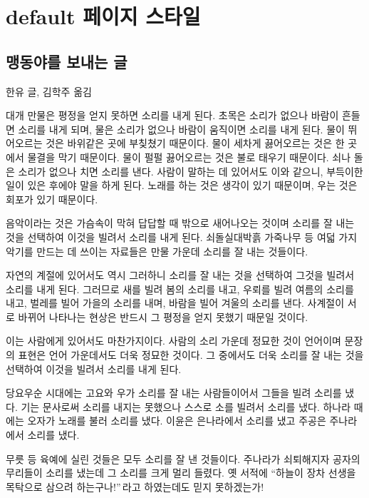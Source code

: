 \documentclass[demo,chapter,openany,amsmath,gremph,lwarp]{oblivoir}
\def\epigraph#1#2{#1\quad #2}
\begin{document}
\chapter{default 페이지 스타일}

\section{맹동야를 보내는 글}
\epigraph{한유 글, }{김학주 옮김}

대개 만물은 평정을 얻지 못하면 소리를 내게 된다.
초목은 소리가 없으나 바람이 흔들면 소리를 내게 되며, 물은 소리가 없으나 바람이
움직이면 소리를 내게 된다. 물이 뛰어오르는 것은 바위같은 곳에 부칮쳤기
때문이다. 물이 세차게 끓어오르는 것은 한 곳에서 물결을 막기 때문이다.
물이 펄펄 끓어오르는 것은 불로 태우기 때문이다. 쇠나 돌은 소리가 없으나
치면 소리를 낸다. 사람이 말하는 데 있어서도 이와 같으니,
부득이한 일이 있은 후에야 말을 하게 된다. 노래를 하는 것은 생각이
있기 때문이며, 우는 것은 회포가 있기 때문이다.

음악이라는 것은 가슴속이 막혀 답답할 때 밖으로 새어나오는 것이며
소리를 잘 내는 것을 선택하여 이것을 빌려서 소리를 내게 된다.
쇠\cntrdot 돌\cntrdot 실\cntrdot 대\cntrdot 박\cntrdot 흙\cntrdot 
가죽\cntrdot 나무 등 여덟 가지 악기를 만드는 데 쓰이는 자료들은 만물
가운데 소리를 잘 내는 것들이다.

자연의 계절에 있어서도 역시 그러하니 소리를 잘 내는 것을 선택하여 그것을
빌려서 소리를 내게 된다. 그러므로 새를 빌려 봄의 소리를 내고, 우뢰를
빌려 여름의 소리를 내고, 벌레를 빌어 가을의 소리를 내며,
바람을 빌어 겨울의 소리를 낸다. 사계절이 서로 바뀌어 나타나는 현상은
반드시 그 평정을 얻지 못했기 때문일 것이다.

이는 사람에게 있어서도 마찬가지이다. 사람의 소리 가운데 정묘한 것이 언어이며
문장의 표현은 언어 가운데서도 더욱 정묘한 것이다. 그 중에서도 더욱 소리를
잘 내는 것을 선택하여 이것을 빌려서 소리를 내게 된다.

당요\cntrdot 우순 시대에는 고요와 우가 소리를 잘 내는 사람들이어서
그들을 빌려 소리를 냈다. 기는 문사로써 소리를 내지는 못했으나
스스로 소를 빌려서 소리를 냈다. 하나라 때에는 오자가 노래를 불러 소리를
냈다. 이윤은 은나라에서 소리를 냈고 주공은 주나라에서 소리를 냈다.

무릇 \cntrdot {} 등 육예에 실린 것들은 모두 소리를
잘 낸 것들이다. 주나라가 쇠퇴해지자 공자의 무리들이 소리를 냈는데
그 소리를 크게 멀리 들렸다. 옛 서적에 ``하늘이 장차 선생을 목탁으로
삼으려 하는구나!''\,라고 하였는데도 믿지 못하겠는가!
\end{document}
